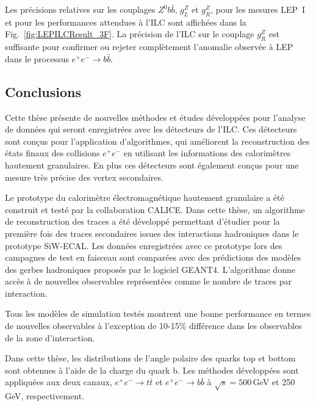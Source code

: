 Les précisions relatives sur les couplages $Z^0 b\bar{b}$, $g_L^Z$ et $g_R^Z$, pour les mesures LEP~I et pour les performances attendues à l'ILC sont affichées dans la Fig.~\ref{fig:LEPILCResult_3F}. 
La précision de l'ILC sur le couplage $g_R^Z$ est suffisante pour confirmer ou rejeter complètement l'anomalie observée à LEP dans le processus $e^+e^-\to b\bar{b}$.



\subsection*{Conclusions}

Cette thèse présente de nouvelles méthodes et études développées pour l'analyse de données qui seront enregistrées avec les détecteurs de l'ILC. 
Ces détecteurs sont conçus pour l'application d'algorithmes, qui améliorent la reconstruction des états finaux des collisions $e^+e^-$ en utilisant les informations des calorimètres hautement granulaires.
En plus ces détecteurs sont également conçus pour une mesure très précise des vertex secondaires.

Le prototype du calorim\`etre \'electromagn\'etique hautement granulaire a été construit et testé par la collaboration CALICE.
Dans cette thèse, un algorithme de reconstruction des traces a été développé permettant d'étudier pour la première fois des traces secondaires issues des interactions hadroniques dans le prototype SiW-ECAL.
Les données enregistrées avec ce prototype lors des campagnes de test en faisceau sont comparées avec des prédictions des modèles des gerbes hadroniques proposés par le logiciel GEANT4. L'algorithme donne accès à de nouvelles observables représentées comme le nombre de traces par interaction. 


Tous les modèles de simulation testés montrent une bonne performance en termes de nouvelles observables à l'exception de 10-15\% différence dans les observables de la zone d'interaction.

Dans cette thèse, les distributions de l'angle polaire des quarks top et bottom sont obtenues à l'aide de la charge du quark b.  
Les méthodes développées sont appliquées aux deux canaux, $e^+ e^- \to t\bar{t}$ et $e^+ e^- \to b\bar{b}$ à $\sqrt {s} = 500$\,GeV et 250\,GeV, respectivement.

